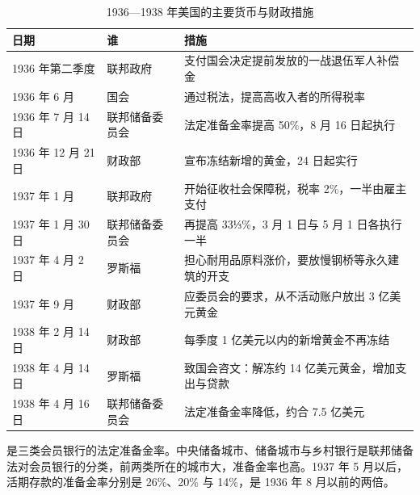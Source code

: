 \begin{table}[tbp]
\centering\small
\caption{1936—1938 年美国的主要货币与财政措施}\label{tab:islm-1937}
\begin{tabularx}{\linewidth}{@{}l l X@{}}
\toprule
日期 & 谁 & 措施 \\
\midrule
1936 年第二季度 & 联邦政府 & 支付国会决定提前发放的一战退伍军人补偿金\cite{velde2009} \\
1936 年 6 月 & 国会 & 通过税法，提高高收入者的所得税率\cite{velde2009} \\
1936 年 7 月 14 日 & 联邦储备委员会 & 法定准备金率提高 50\%，8 月 16 日起执行\cite{frb1936aug,bms1943b} \\
1936 年 12 月 21 日 & 财政部 & 宣布冻结新增的黄金，24 日起实行\cite{frb1937jan,frb1937a} \\
1937 年 1 月 & 联邦政府 & 开始征收社会保障税，税率 2\%，一半由雇主支付\cite{velde2009} \\
1937 年 1 月 30 日 & 联邦储备委员会 & 再提高 33⅓\%，3 月 1 日与 5 月 1 日各执行一半\cite{frb1937a} \\
1937 年 4 月 2 日 & 罗斯福 & 担心耐用品原料涨价，要放慢钢桥等永久建筑的开支\cite{app1937} \\
1937 年 9 月 & 财政部 & 应委员会的要求，从不活动账户放出 3 亿美元黄金\cite{frb1938may} \\
1938 年 2 月 14 日 & 财政部 & 每季度 1 亿美元以内的新增黄金不再冻结\cite{frb1938mar} \\
1938 年 4 月 14 日 & 罗斯福 & 致国会咨文：解冻约 14 亿美元黄金，增加支出与贷款\cite{app1938} \\
1938 年 4 月 16 日 & 联邦储备委员会 & 法定准备金率降低，约合 7.5 亿美元\cite{frb1938may,bms1943b} \\
\bottomrule
\end{tabularx}
\end{table}

是三类会员银行的法定准备金率。中央储备城市、储备城市与乡村银行是联邦储备法对会员银行的分类，前两类所在的城市大，准备金率也高。1937 年 5 月以后，活期存款的准备金率分别是 26\%、20\% 与 14\%，是 1936 年 8 月以前的两倍\cite{bms1943b}。

